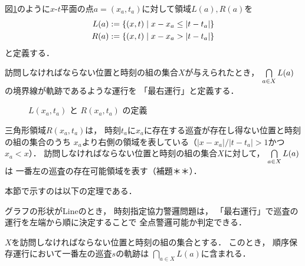 \begin{defi}
  図\ref{tikz:defLR}のように$x$-$t$平面の点$a = (x_a, t_a)$に対して領域$L(a), R(a)$を
  \begin{align*}
    L(a) &:= \left\{{(x, t)}\;\middle|\;{ x - x_a \leq |t - t_a| }\right\} \\
    R(a) &:= \left\{{(x, t)}\;\middle|\;{ x - x_a >    |t - t_a| }\right\}
  \end{align*}
  と定義する．

  訪問しなければならない位置と時刻の組の集合$X$が与えられたとき，
  $\bigcap\limits_{a \in X} L(a)$の境界線が軌跡であるような運行を
  「最右運行」と定義する．
\end{defi}

\begin{figure}[h]
  \centering
  \caption{$L(x_a, t_a)$ と $R(x_a, t_a)$ の定義 \label{tikz:defLR}}
\end{figure}

三角形領域$R(x_a, t_a)$は，
時刻$t_a$に$x_a$に存在する巡査が存在し得ない位置と時刻の組の集合のうち
$x_a$より右側の領域を表している（$|x - x_a| / |t - t_a| > 1$かつ$x_a < x$）．
訪問しなければならない位置と時刻の組の集合$X$に対して，
$\bigcap\limits_{a \in X} L(a)$は
一番左の巡査の存在可能領域を表す（補題＊＊）．



本節で示すのは以下の定理である．
\begin{theo}
  \label{lemm:LineExactFinite}
  グラフの形状がLineのとき，
  時刻指定協力警邏問題は，
  「最右運行」で巡査の運行を左端から順に決定することで
  全点警邏可能か判定できる．
\end{theo}


\begin{lemm}
  \label{lemm:leftmostAgentExistableTerrain}
  $X$を訪問しなければならない位置と時刻の組の集合とする．
  このとき，
  順序保存運行において一番左の巡査$s$の軌跡は
  $\bigcap_{a \in X} L(a)$に含まれる．
\end{lemm}


